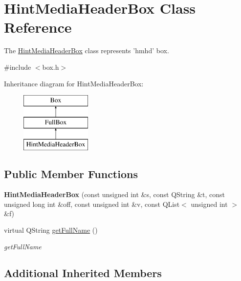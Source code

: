 \hypertarget{class_hint_media_header_box}{\section{Hint\-Media\-Header\-Box Class Reference}
\label{class_hint_media_header_box}
}


The \hyperlink{class_hint_media_header_box}{Hint\-Media\-Header\-Box} class represents 'hmhd' box.  




{\ttfamily \#include $<$box.\-h$>$}

Inheritance diagram for Hint\-Media\-Header\-Box\-:\begin{figure}[H]
\begin{center}
\leavevmode
\includegraphics[height=3.000000cm]{class_hint_media_header_box}
\end{center}
\end{figure}
\subsection*{Public Member Functions}
\begin{DoxyCompactItemize}
\item 
\hypertarget{class_hint_media_header_box_abdca8334746625953b8e3f13d2461048}{{\bfseries Hint\-Media\-Header\-Box} (const unsigned int \&s, const Q\-String \&t, const unsigned long int \&off, const unsigned int \&v, const Q\-List$<$ unsigned int $>$ \&f)}\label{class_hint_media_header_box_abdca8334746625953b8e3f13d2461048}

\item 
virtual Q\-String \hyperlink{class_hint_media_header_box_aacaa05edc0b37296c6b0cad9b216babe}{get\-Full\-Name} ()
\begin{DoxyCompactList}\small\item\em get\-Full\-Name \end{DoxyCompactList}\end{DoxyCompactItemize}
\subsection*{Additional Inherited Members}


